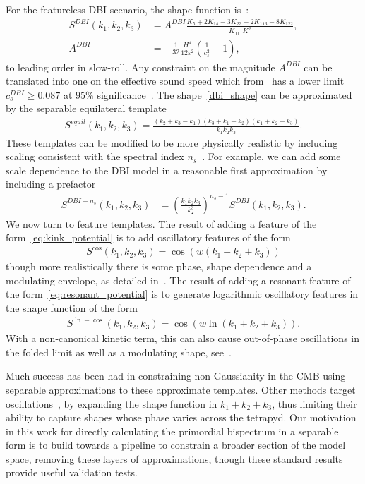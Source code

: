 For the featureless DBI scenario, the shape function is~\cite{dbi_in_the_sky}:
\begin{align}\label{dbi_shape}
    S^{DBI}(k_1,k_2,k_3) &= A^{DBI}\frac{K_5+2K_{14}-3K_{23}+2K_{113}-8K_{122}}{K_{111}K^2},\\
    A^{DBI} &= -\frac{1}{32}\frac{H^4}{12\varepsilon^2}\left(\frac{1}{c_s^2}-1\right),
\end{align}
to leading order in slow-roll.
Any constraint on the magnitude $A^{DBI}$ can be translated into one 
on the effective sound speed which from \planck~has a lower limit $c_s^{DBI} \geq 0.087$
at $95\%$ significance~\cite{Planck_NG_2015}.
The shape~\eqref{dbi_shape} can be approximated by the separable equilateral template
\begin{align}\label{equil_shape}
    S^{equil}(k_1,k_2,k_3) = \frac{(k_2+k_3-k_1)(k_3+k_1-k_2)(k_1+k_2-k_3)}{k_1k_2k_3}.
\end{align}
These templates can be modified to be more physically realistic by including
scaling consistent with the spectral index $n_s$~\cite{Planck_NG_2015}.
For example, we can add some scale dependence to the DBI model in a reasonable first approximation by including a prefactor
\begin{align}\label{dbi_ns_shape}
    S^{DBI-n_s}(k_1,k_2,k_3) &= {\left(\frac{k_1k_2k_3}{k^3_\star}\right)}^{n_s-1}S^{DBI}(k_1,k_2,k_3).
\end{align}
We now turn to feature templates.
The result of adding a feature of the form~\eqref{eq:kink_potential}
is to add oscillatory features of the form
\begin{align}\label{cos_shape}
    S^{\cos}(k_1,k_2,k_3) = \cos(w(k_1+k_2+k_3))
\end{align}
though more realistically there is some phase, shape dependence and a modulating envelope,
as detailed in~\cite{adshead}.
The result of adding a resonant feature of the form~\eqref{eq:resonant_potential}
is to generate logarithmic oscillatory features in the shape function of the form
\begin{align}\label{ln_cos_shape}
    S^{\ln-\cos}(k_1,k_2,k_3) = \cos(w\ln(k_1+k_2+k_3)).
\end{align}
With a non-canonical kinetic term, this can also
cause out-of-phase oscillations in the folded limit as well as a modulating shape,
see~\cite{chen_folded_resonant}.


Much success has been had in constraining non-Gaussianity
in the CMB using separable approximations to these approximate templates.
Other methods target oscillations~\cite{reso_estimator}, by expanding the shape function
in $k_1+k_2+k_3$, thus limiting their ability to capture shapes whose
phase varies across the tetrapyd.
Our motivation in this work for directly calculating the primordial
bispectrum in a separable form is to build towards
a pipeline to constrain a broader section of the model space,
removing these layers of approximations,
though these standard results provide useful validation tests.
